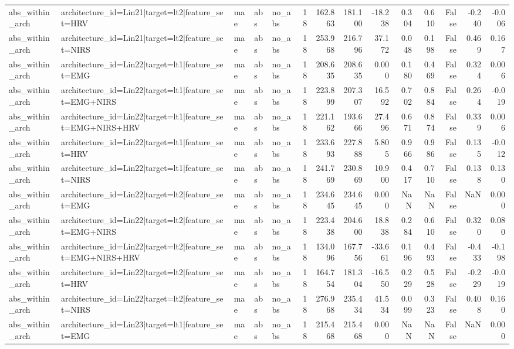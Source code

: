 \begin{table}
\begin{tabular}{lllllrrrrrrrrr}
abs_within_arch & architecture_id=Lin21|target=lt2|feature_set=HRV & mae & abs & no_abs & 18 & 162.863 & 181.100 & -18.238 & 0.304 & 0.610 & False & -0.240 & -0.006 \\
abs_within_arch & architecture_id=Lin21|target=lt2|feature_set=NIRS & mae & abs & no_abs & 18 & 253.968 & 216.796 & 37.172 & 0.048 & 0.198 & False & 0.469 & 0.167 \\
abs_within_arch & architecture_id=Lin22|target=lt1|feature_set=EMG & mae & abs & no_abs & 18 & 208.635 & 208.635 & 0.000 & 0.180 & 0.469 & False & 0.324 & 0.006 \\
abs_within_arch & architecture_id=Lin22|target=lt1|feature_set=EMG+NIRS & mae & abs & no_abs & 18 & 223.899 & 207.307 & 16.592 & 0.702 & 0.884 & False & 0.264 & -0.019 \\
abs_within_arch & architecture_id=Lin22|target=lt1|feature_set=EMG+NIRS+HRV & mae & abs & no_abs & 18 & 221.162 & 193.666 & 27.496 & 0.671 & 0.874 & False & 0.339 & 0.006 \\
abs_within_arch & architecture_id=Lin22|target=lt1|feature_set=HRV & mae & abs & no_abs & 18 & 233.693 & 227.888 & 5.805 & 0.966 & 0.986 & False & 0.135 & -0.012 \\
abs_within_arch & architecture_id=Lin22|target=lt1|feature_set=NIRS & mae & abs & no_abs & 18 & 241.769 & 230.869 & 10.900 & 0.417 & 0.710 & False & 0.138 & 0.130 \\
abs_within_arch & architecture_id=Lin22|target=lt2|feature_set=EMG & mae & abs & no_abs & 18 & 234.645 & 234.645 & 0.000 & NaN & NaN & False & NaN & 0.000 \\
abs_within_arch & architecture_id=Lin22|target=lt2|feature_set=EMG+NIRS & mae & abs & no_abs & 18 & 223.438 & 204.600 & 18.838 & 0.284 & 0.610 & False & 0.320 & 0.080 \\
abs_within_arch & architecture_id=Lin22|target=lt2|feature_set=EMG+NIRS+HRV & mae & abs & no_abs & 18 & 134.096 & 167.756 & -33.661 & 0.196 & 0.493 & False & -0.433 & -0.198 \\
abs_within_arch & architecture_id=Lin22|target=lt2|feature_set=HRV & mae & abs & no_abs & 18 & 164.754 & 181.304 & -16.550 & 0.229 & 0.528 & False & -0.229 & -0.019 \\
abs_within_arch & architecture_id=Lin22|target=lt2|feature_set=NIRS & mae & abs & no_abs & 18 & 276.968 & 235.434 & 41.534 & 0.099 & 0.323 & False & 0.408 & 0.160 \\
abs_within_arch & architecture_id=Lin23|target=lt1|feature_set=EMG & mae & abs & no_abs & 18 & 215.468 & 215.468 & 0.000 & NaN & NaN & False & NaN & 0.000 \\

\end{tabular}
\end{table}

